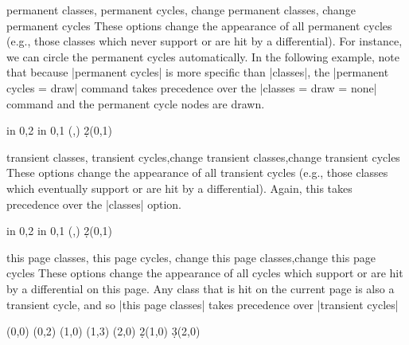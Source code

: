 \begin{sseqdata}[|| name = ex1, cohomological Serre grading]
\begin{stylekeylist}{permanent classes, permanent cycles, change permanent classes, change permanent cycles}
These options change the appearance of all permanent cycles (e.g., those classes which never support or are hit by a differential). For instance, we can circle the permanent cycles automatically. In the following example, note that because |permanent cycles| is more specific than |classes|, the |permanent cycles = {draw}| command takes precedence over the |classes = {draw = none}| command and the permanent cycle nodes are drawn.
\begin{codeexample}[width = 6.5cm]
\begin{sseqpage}[ cohomological Serre grading,
                  classes = { draw = none },
                  permanent cycles = {draw} ]
\foreach \x in {0,2} \foreach \y in {0,1} {
    \class["\mathbb{Z}"](\x,\y)
}
\d2(0,1)
\end{sseqpage}
\end{codeexample}
\end{stylekeylist}

\begin{stylekeylist}{transient classes, transient cycles,change transient classes,change transient cycles}
These options change the appearance of all transient cycles (e.g., those classes which eventually support or are hit by a differential). Again, this takes precedence over the |classes| option.
\begin{codeexample}[width = 6.5cm]
\begin{sseqpage}[ cohomological Serre grading,
                  classes = { draw = none },
                  transient cycles = red ]
\foreach \x in {0,2} \foreach \y in {0,1} {
    \class["\mathbb{Z}"](\x,\y)
}
\d2(0,1)
\end{sseqpage}
\end{codeexample}
\end{stylekeylist}

\begin{stylekeylist}{this page classes, this page cycles, change this page classes,change this page cycles}
These options change the appearance of all cycles which support or are hit by a differential on this page. Any class that is hit on the current page is also a transient cycle, and so |this page classes| takes precedence over |transient cycles|
\begin{codeexample}[width = 6cm]
\begin{sseqdata}[ name = this page cycles example, Adams grading,
                  transient cycles = { red, fill }, this page cycles = { blue } ]
\class(0,0)
\class(0,2) \class(1,0)
\class(1,3) \class(2,0)
\d2(1,0) \d3(2,0)
\end{sseqdata}
\printpage[ name = this page cycles example, page = 2 ] \qquad
\printpage[ name = this page cycles example, page = 3 ]
\end{codeexample}
\end{stylekeylist}


\end{sseqdata}

